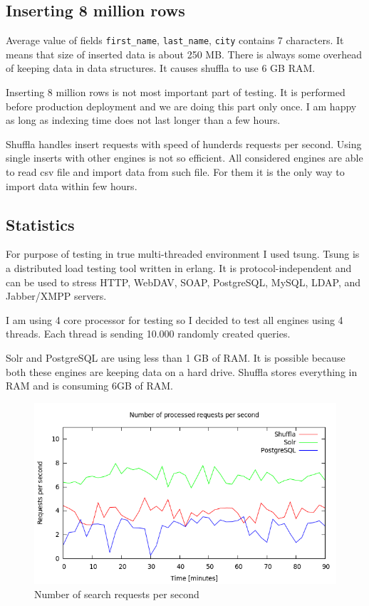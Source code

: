 \documentclass[10pt,a4paper]{article}
\begin{document}
\subsection{Inserting 8 million rows}

Average value of fields \verb|first_name|, \verb|last_name|, \verb|city| contains 7 characters. It means that size of inserted data is about 250 MB. There is always some overhead of keeping data in data structures. It causes shuffla to use 6 GB RAM.

Inserting 8 million rows is not most important part of testing. It is performed before production deployment and we are doing this part only once. I am happy as long as indexing time does not last longer than a few hours. 

Shuffla handles insert requests with speed of hunderds requests per second. Using single inserts with other engines is not so efficient. All considered engines are able to read csv file and import data from such file. For them it is the only way to import data within few hours.

\subsection{Statistics}

For purpose of testing in true multi-threaded environment I used tsung. Tsung is a distributed load testing tool written in erlang. It is protocol-independent and can be used to stress HTTP, WebDAV, SOAP, PostgreSQL, MySQL, LDAP, and Jabber/XMPP servers. 

I am using 4 core processor for testing so I decided to test all engines using 4 threads. Each thread is sending 10.000 randomly created queries. 

Solr and PostgreSQL are using less than 1 GB of RAM. It is possible because both these engines are keeping data on a hard drive. Shuffla stores everything in RAM and is consuming 6GB of RAM. 

\begin{figure}
\centering
  \includegraphics[width=12cm]{request_count_tn}
  \caption{Number of search requests per second}
  \label{fig:request_count_tn}
\end{figure}
\end{document}
